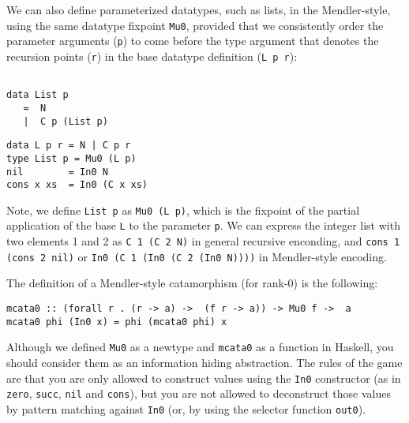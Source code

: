 \documentclass[letterpaper,12pt]{article}
\begin{document}
We can also define parameterized datatypes, such as lists, in the Mendler-style,
using the same datatype fixpoint \verb|Mu0|, provided that we consistently order
the parameter arguments (\verb|p|) to come before the type argument that denotes
the recursion points (\verb|r|) in the base datatype definition (\verb|L p r|):
\begin{center}
\begin{minipage}{.49\linewidth}
\begin{verbatim}

data List p
   =  N
   |  C p (List p)
\end{verbatim}
\end{minipage}
\begin{minipage}{.49\linewidth}
\begin{verbatim}
data L p r = N | C p r
type List p = Mu0 (L p)
nil        = In0 N
cons x xs  = In0 (C x xs)
\end{verbatim}
\end{minipage}
\end{center}
Note, we define \verb|List p| as \verb|Mu0 (L p)|, which is the fixpoint of
the partial application of the base \verb|L| to the parameter \verb|p|.
We can express the integer list with two elements 1 and 2 as
\texttt{C 1 (C 2 N)}
in general recursive enconding, and \texttt{cons 1 (cons 2 nil)} or
\texttt{In0 (C 1 (In0 (C 2 (In0 N))))} in Mendler-style encoding.


The definition of a Mendler-style catamorphism (for rank-0) is the following:
\begin{verbatim}
mcata0 :: (forall r . (r -> a) ->  (f r -> a)) -> Mu0 f ->  a
mcata0 phi (In0 x) = phi (mcata0 phi) x
\end{verbatim}
Although we defined \verb|Mu0| as a newtype and \verb|mcata0|
as a function in Haskell, you should consider them as an
information hiding abstraction.
The rules of the game are that you are only allowed to construct values
using the \verb|In0| constructor (as in \verb|zero|, \verb|succ|,
\verb|nil| and \verb|cons|),
but you are not allowed to deconstruct those values by pattern matching
against \verb|In0| (or, by using the selector function \verb|out0|).
\end{document}
